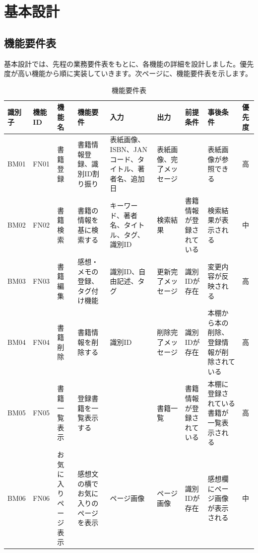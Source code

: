 \documentclass[a4paper, 11pt, titlepage]{jsarticle}
\begin{document}
\section{基本設計}
\subsection{機能要件表}
基本設計では、先程の業務要件表をもとに、各機能の詳細を設計しました。優先度が高い機能から順に実装していきます。次ページに、機能要件表を示します。
\begin{table}[htbp]
  \centering
  \begin{tabular}{|>{\centering\arraybackslash}m{0.9cm}|>{\centering\arraybackslash}m{0.9cm}|>{\centering\arraybackslash}m{1.3cm}|>{\centering\arraybackslash}m{1.5cm}|>{\centering\arraybackslash}m{1.8cm}|>{\centering\arraybackslash}m{1.2cm}|>{\centering\arraybackslash}m{1.3cm}|>{\centering\arraybackslash}m{1.3cm}|>{\centering\arraybackslash}m{0.3cm}|}
    \hline
    \textbf{識別子} & \textbf{機能ID} & \textbf{機能名} & \textbf{機能要件} & \textbf{入力} & \textbf{出力} & \textbf{前提条件} & \textbf{事後条件} & \textbf{優先度} \\
    \hline\hline
    BM01 & FN01 & 書籍登録 & 書籍情報登録、識別ID割り振り & 表紙画像、ISBN、JANコード、タイトル、著者名、追加日 & 表紙画像、完了メッセージ & & 表紙画像が参照できる & 高 \\
    \hline
    BM02 & FN02 & 書籍検索 & 書籍の情報を基に検索する & キーワード、著者名、タイトル、タグ、識別ID & 検索結果 & 書籍情報が登録されている & 検索結果が表示される & 中 \\
    \hline
    BM03 & FN03 & 書籍編集 & 感想・メモの登録、タグ付け機能 & 識別ID、自由記述、タグ & 更新完了メッセージ & 識別IDが存在 & 変更内容が反映される & 高 \\
    \hline
    BM04 & FN04 & 書籍削除 & 書籍情報を削除する & 識別ID & 削除完了メッセージ & 識別IDが存在 & 本棚から本の削除、登録情報が削除されている & 高 \\
    \hline
    BM05 & FN05 & 書籍一覧表示 & 登録書籍を一覧表示する & & 書籍一覧 & 書籍情報が登録されている & 本棚に登録されている書籍が一覧表示される & 高 \\
    \hline
    BM06 & FN06 & お気に入りページ表示 & 感想文の横でお気に入りのページを表示 & ページ画像 & ページ画像 & 識別IDが存在 & 感想欄にページ画像が表示される & 中 \\
    \hline
  \end{tabular}
  \caption{機能要件表}
  \label{tab:functions}
\end{table}
\clearpage
\end{document}
